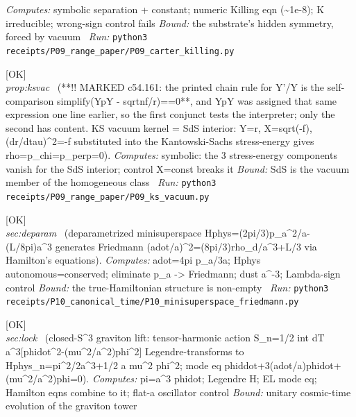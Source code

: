 \begin{description}
\emph{Computes:} symbolic separation + constant; numeric Killing eqn (\textasciitilde{}1e-8); K irreducible; wrong-sign control fails
 \emph{Bound:} the substrate's hidden symmetry, forced by vacuum
\ \emph{Run:} \texttt{python3 receipts/P09\_range\_paper/P09\_carter\_killing.py}
\item[\label{rcpt:P09_ks_vacuum}\texttt{P09\_ks\_vacuum}]\hfill\textsf{[OK]}\\
\textit{prop:ksvac} \ (**!! MARKED c54.161: the printed chain rule for Y'/Y is the self-comparison simplify(YpY - sqrtnf/r)==0**, and YpY was assigned that same expression one line earlier, so the first conjunct tests the interpreter; only the second has content. KS vacuum kernel = SdS interior: Y=r, X=sqrt(-f), (dr/dtau)\textasciicircum{}2=-f substituted into the Kantowski-Sachs stress-energy gives rho=p\_chi=p\_perp=0). 
\emph{Computes:} symbolic: the 3 stress-energy components vanish for the SdS interior; control X=const breaks it
 \emph{Bound:} SdS is the vacuum member of the homogeneous class
\ \emph{Run:} \texttt{python3 receipts/P09\_range\_paper/P09\_ks\_vacuum.py}
\item[\label{rcpt:P10_minisuperspace_friedmann}\texttt{P10\_minisuperspace\_friedmann}]\hfill\textsf{[OK]}\\
\textit{sec:deparam} \ (deparametrized minisuperspace Hphys=(2pi/3)p\_a\textasciicircum{}2/a-(L/8pi)a\textasciicircum{}3 generates Friedmann (adot/a)\textasciicircum{}2=(8pi/3)rho\_d/a\textasciicircum{}3+L/3 via Hamilton's equations). 
\emph{Computes:} adot=4pi p\_a/3a; Hphys autonomous=conserved; eliminate p\_a -> Friedmann; dust a\textasciicircum{}-3; Lambda-sign control
 \emph{Bound:} the true-Hamiltonian structure is non-empty
\ \emph{Run:} \texttt{python3 receipts/P10\_canonical\_time/P10\_minisuperspace\_friedmann.py}
\item[\label{rcpt:P10_graviton_lift}\texttt{P10\_graviton\_lift}]\hfill\textsf{[OK]}\\
\textit{sec:lock} \ (closed-S\textasciicircum{}3 graviton lift: tensor-harmonic action S\_n=1/2 int dT a\textasciicircum{}3[phidot\textasciicircum{}2-(mu\textasciicircum{}2/a\textasciicircum{}2)phi\textasciicircum{}2] Legendre-transforms to Hphys\_n=pi\textasciicircum{}2/2a\textasciicircum{}3+1/2 a mu\textasciicircum{}2 phi\textasciicircum{}2; mode eq phiddot+3(adot/a)phidot+(mu\textasciicircum{}2/a\textasciicircum{}2)phi=0). 
\emph{Computes:} pi=a\textasciicircum{}3 phidot; Legendre H; EL mode eq; Hamilton eqns combine to it; flat-a oscillator control
 \emph{Bound:} unitary cosmic-time evolution of the graviton tower

\end{description}
